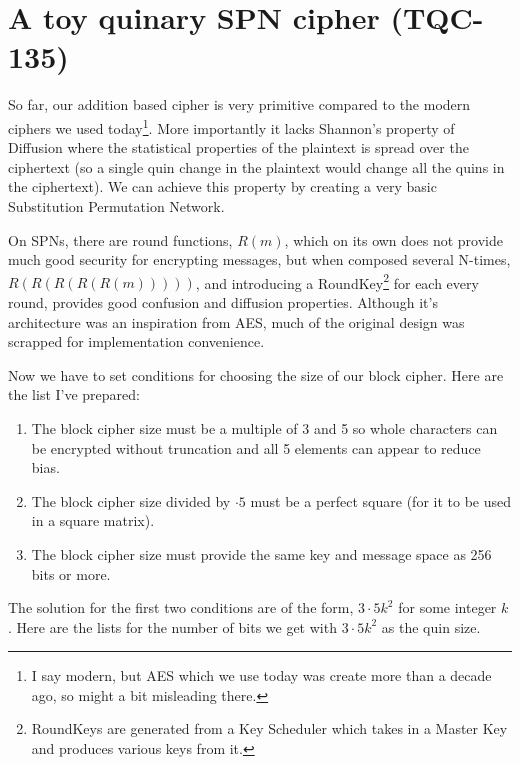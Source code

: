 \documentclass{article}
\begin{document}

\section{A toy quinary SPN cipher (TQC-135)}

So far, our addition based cipher is very primitive compared to the modern
ciphers we used today\footnote{I say modern, but AES which we use today
was create more than a decade ago, so might a bit misleading there.}.
More importantly it lacks Shannon's property of Diffusion where the 
statistical properties of the plaintext is spread over the ciphertext
(so a single quin change in the plaintext would change all the quins in
the ciphertext). We can achieve this property by creating a very basic
Substitution Permutation Network.

On SPNs, there are round functions, $R(m)$, which on its own does
not provide much good security for encrypting messages, but when
composed several N-times, $R(R(R(R(R(m)))))$, and introducing a
RoundKey\footnote{RoundKeys are generated from a Key Scheduler which
takes in a Master Key and produces various keys from it.} for each every
round, provides good confusion and diffusion properties. Although it's
architecture was an inspiration from AES, much of the original design
was scrapped for implementation convenience.

Now we have to set conditions for choosing the size of
our block cipher. Here are the list I've prepared:

\begin{enumerate}

\item The block cipher size must be a multiple of 3 and 5 so whole characters
can be encrypted without truncation and all 5 elements can appear to reduce bias.

\item The block cipher size divided by $\cdot 5$ must be a perfect square (for
it to be used in a square matrix).

\item The block cipher size must provide the same key and message space
as 256 bits or more.

\end{enumerate}

The solution for the first two conditions are of the form, $3\cdot 5k^2$ for some integer $k$. Here
are the lists for the number of bits we get with $3\cdot 5k^2$ as the quin size.
\end{document}
